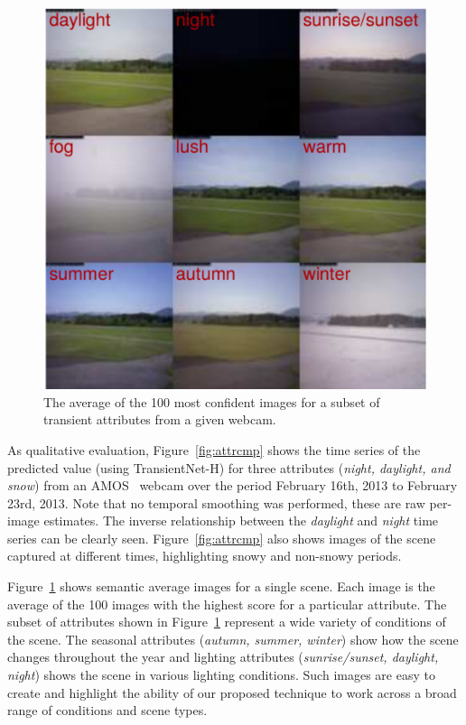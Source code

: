 \documentclass[10pt,twocolumn,letterpaper]{article}
\newcommand{\figref}[1]{Figure~\ref{fig:#1}}
\begin{document}
\begin{figure}[t]
	\centering
		\includegraphics[width=\linewidth]{figs/montage_pruned_cam_7211.pdf}
		\caption{The average of the 100 most confident images for
             a subset of transient attributes from a given webcam.} 
		\label{fig:netvis}
\end{figure}


As qualitative evaluation, \figref{attrcmp} shows the time series
of the predicted value (using TransientNet-H) for three attributes
(\textit{night, daylight, and snow}) from an AMOS~\cite{jacobs07amos}
webcam over the period February 16th, 2013 to February 23rd, 2013.
Note that no temporal smoothing was performed, these are raw per-image
estimates.  The inverse relationship between the \textit{daylight} and
\textit{night} time series can be clearly seen.  \figref{attrcmp} also
shows images of the scene captured at different times, highlighting
snowy and non-snowy periods.

\figref{netvis} shows semantic average images for a single scene.  Each
image is the average of the 100 images with the highest score for a particular
attribute.  The subset of attributes shown in \figref{netvis} represent a wide
variety of conditions of the scene.  The seasonal attributes (\textit{autumn,
summer, winter}) show how the scene changes throughout the year and lighting
attributes (\textit{sunrise/sunset, daylight, night}) shows the scene in
various lighting conditions.  Such images are easy to create and highlight the
ability of our proposed technique to work across a broad range of conditions
and scene types. 
\end{document}
